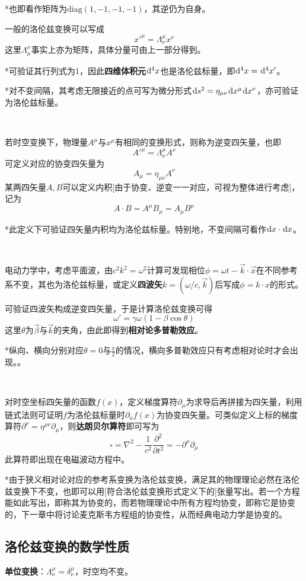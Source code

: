 \documentclass[a4paper,UTF8,fontset=windows]{ctexart}
\newcommand*{\dr}{\hspace{0.07em}\mathrm{d}}
\newcommand*{\vks}{\vec{k}}
\newcommand*{\vx}{\vec{x}}
\newcommand*{\vbeta}{\vec{\beta}}
\newcommand*{\ppt}[2][t^2]{\frac{\partial^2 #2}{\partial #1}}
\begin{document}
*也即看作矩阵为$\mathrm{diag(1,-1,-1,-1)}$，其逆仍为自身。

一般的洛伦兹变换可以写成
$${x'}^\mu=\Lambda_\nu^\mu x^\nu$$
这里$\Lambda_\mu^\nu$事实上亦为矩阵，具体分量可由上一部分得到。

*可验证其行列式为1，因此\textbf{四维体积元}$\dr^4x$也是洛伦兹标量，即$\dr^4x=\dr^4x'$。

*对不变间隔，其考虑无限接近的点可写为微分形式$\dr s^2=\eta_{\mu\nu}\dr x^\mu\dr x^\nu$，亦可验证为洛伦兹标量。

\

若时空变换下，物理量$A^\mu$与$x^\mu$有相同的变换形式，则称为逆变四矢量，也即
$${A'}^\mu=\Lambda_\nu^\mu A^\nu$$
可定义对应的协变四矢量为
$$A_\mu=\eta_{\mu\nu}A^\nu$$
某两四矢量$A,B$可以定义内积[由于协变、逆变一一对应，可视为整体进行考虑]，记为
$$A\cdot B=A^\mu B_\mu=A_\mu B^\mu$$

*此定义下可验证四矢量内积均为洛伦兹标量。特别地，不变间隔可看作$\dr x\cdot\dr x$。

\

电动力学中，考虑平面波，由$c^2k^2=\omega^2$计算可发现相位$\phi=\omega t-\vks\cdot\vx$在不同参考系不变，其也为洛伦兹标量，或定义\textbf{四波矢}$k=(\omega/c,\vks)$后写成$\phi=k\cdot x$的形式。

可验证四波矢构成逆变四矢量，于是计算洛伦兹变换可得
$$\omega'=\gamma\omega(1-\beta\cos\theta)$$
这里$\theta$为$\vbeta$与$\vks$的夹角，由此即得到\textbf{相对论多普勒效应}。

*纵向、横向分别对应$\theta=0$与$\frac{\pi}{2}$的情况，横向多普勒效应只有考虑相对论时才会出现。。

\

对时空坐标四矢量的函数$f(x)$，定义梯度算符$\partial_\mu$为求导后再拼接为四矢量，利用链式法则可证明$f$为洛伦兹标量时$\partial_uf(x)$为协变四矢量。可类似定义上标的梯度算符$\partial^\nu=\eta^{\mu\nu}\partial_\mu$，则\textbf{达朗贝尔算符}即可写为
$$\square=\nabla^2-\frac{1}{c^2}\ppt{}=-\partial^\mu\partial_\mu$$
此算符即出现在电磁波动方程中。

*由于狭义相对论对应的参考系变换为洛伦兹变换，满足其的物理理论必然在洛伦兹变换下不变，也即可以用[符合洛伦兹变换形式定义下的]张量写出。若一个方程能如此写出，即称其为协变的，而若物理理论中所有方程均协变，即称它是协变的，下一章中将讨论麦克斯韦方程组的协变性，从而经典电动力学是协变的。

\subsection{洛伦兹变换的数学性质}
\textbf{单位变换}：$\Lambda_\nu^\mu=\delta_\nu^\mu$，时空均不变。
\end{document}
